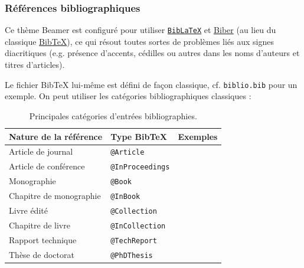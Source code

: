 \documentclass[10pt,    %
    french,             %
    xcolor=table,       %
    envcountsect,       %
    aspectratio=43      %
]{beamer}
\begin{document}
\begin{frame}
    \frametitle{Références bibliographiques}
    
    Ce thème Beamer est configuré pour utiliser \href{https://ctan.org/pkg/biblatex?lang=en}{\texttt{BibLaTeX}} et \href{http://biblatex-biber.sourceforge.net/}{Biber} (au lieu du classique \href{http://www.bibtex.org/}{BibTeX}), ce qui résout toutes sortes de problèmes liés aux signes diacritiques (e.g. présence d'accents, cédilles ou autres dans les noms d'auteurs et titres d'articles).
    
    \vspace{0.25cm}
    Le fichier BibTeX lui-même est défini de façon classique, cf. \texttt{biblio.bib} pour un exemple. On peut utiliser les catégories bibliographiques classiques :
    
    \begin{table}[H]
        \small
        \centering
        \begin{tabular}{l l r}
            \hline
	        \rowcolor{fgLightRed} 
            \textbf{Nature de la référence} & \textbf{Type BibTeX} & \textbf{Exemples}\\
            \hline
            Article de journal & \texttt{@Article} & \cite{Fortunato2010, Cossu2016} \\
            Article de conférence & \texttt{@InProceedings} & \cite{Wei1989, Mauttone2008} \\
            Monographie & \texttt{@Book} & \cite{Wolsey1998, Masuda2016} \\
            Chapitre de monographie & \texttt{@InBook} & \cite{Mainzer2007a, Reichardt2009a} \\
            Livre édité & \texttt{@Collection} & \cite{Pastor-Satorras2003a, Brandes2005} \\
            Chapitre de livre & \texttt{@InCollection} & \cite{Danon2007, Labatut2012a} \\
            Rapport technique & \texttt{@TechReport} & \cite{Rosvall2009a, Paraskevopoulos2013} \\
            Thèse de doctorat & \texttt{@PhDThesis} & \cite{Wong1978, Gerbaud2010} \\
            \hline
        \end{tabular}
        \vspace{-0.25cm}
        \caption{Principales catégories d'entrées bibliographies.}
        \label{tab:bibtex}
    \end{table}
\end{frame}
\end{document}
